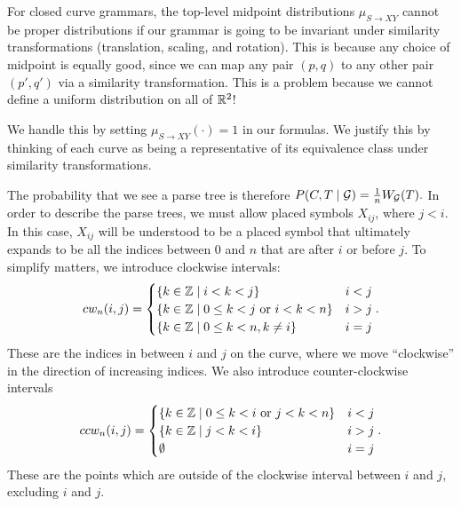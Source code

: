 
\begin{rmk}
  For closed curve grammars, the top-level midpoint distributions
  $\mu_{S\to XY}$ cannot be proper distributions if our grammar is
  going to be invariant under similarity transformations (translation,
  scaling, and rotation). This is because any choice of midpoint is
  equally good, since we can map any pair $(p,q)$ to any other pair
  $(p',q')$ via a similarity transformation. This is a problem
  because we cannot define a uniform distribution on all of $\mathbb{R}^2$!

  We handle this by setting $\mu_{S\to XY}(\cdot) = 1$ in our
  formulas. We justify this by thinking of each curve as being a
  representative of its equivalence class under similarity
  transformations.  
\end{rmk}

The probability that we see a parse tree is therefore $P(C,T\mid {\mathcal G})
= \frac{1}{n} W_{{\mathcal G}}(T).$ In order to describe the parse trees, we
must allow placed symbols $X_{ij}$, where $j<i$. In this case,
$X_{ij}$ will be understood to be a placed symbol that ultimately
expands to be all the indices between $0$ and $n$ that are after $i$
or before $j$. To simplify matters, we introduce clockwise intervals:
$$cw_n(i,j) = 
\begin{cases}
\{k \in {\mathbb Z} \mid i < k < j\} & i < j \\
\{k \in {\mathbb Z} \mid 0 \le k < j \mbox{ or } i < k < n \} & i > j \\
\{k \in {\mathbb Z} \mid 0\le k < n, k\ne i \} & i = j\\
\end{cases}.$$
These are the indices in between $i$ and $j$ on the curve, where we
move ``clockwise'' in the direction of increasing indices.  We also
introduce counter-clockwise intervals
$$ccw_n(i,j) = 
\begin{cases}
\{k \in {\mathbb Z} \mid 0 \le k < i \mbox{ or } j < k < n \} & i < j \\
\{k \in {\mathbb Z} \mid j < k < i\} & i > j \\
\emptyset & i = j\\
\end{cases}.$$
These are the points which are outside of the clockwise interval
between $i$ and $j$, excluding $i$ and $j$.

